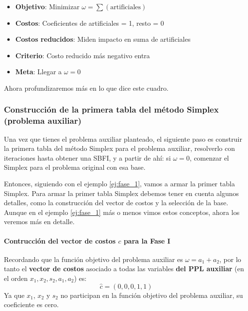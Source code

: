 \begin{tcolorbox}[interesting_data, title=Siempre recordar lo que se busca en la Fase I]
  \begin{itemize}
    \item \textbf{Objetivo}: Minimizar \(\omega = \sum(\text{artificiales})\)
    \item \textbf{Costos}: Coeficientes de artificiales = 1, resto = 0
    \item \textbf{Costos reducidos}: Miden impacto en suma de artificiales
    \item \textbf{Criterio}: Costo reducido más negativo entra
    \item \textbf{Meta}: Llegar a \(\omega = 0\)
  \end{itemize}
\end{tcolorbox}
Ahora profundizaremos más en lo que dice este cuadro. 

\subsubsection{Construcción de la primera tabla del método Simplex (problema auxiliar)}

Una vez que tienes el problema auxiliar planteado, el siguiente paso es construir la primera tabla del método Simplex para el problema auxiliar, resolverlo con iteraciones hasta obtener una SBFI, y a partir de ahí: si \(\omega = 0\), comenzar el Simplex para el problema original con esa base.

Entonces, siguiendo con el ejemplo \ref{ej:fase_1}, vamos a armar la primer tabla Simplex. Para armar la primer tabla Simplex debemos tener en cuenta algunos detalles, como la construcción del vector de costos y la selección de la base. Aunque en el ejemplo \ref{ej:fase_1} más o menos vimos estos conceptos, ahora los veremos más en detalle.

\paragraph{Contrucción del vector de costos \(c\) para la Fase I}

Recordando que la función objetivo del problema auxiliar es \(\omega = a_1 + a_2\), por lo tanto el \textbf{vector de costos} asociado a todas las variables \textbf{del PPL auxiliar} (en el orden \(x_1, x_2, s_2, a_1, a_2\)) es: 
\[
  \hat{c} = (0, 0, 0, 1, 1)
\]
Ya que \(x_1\), \(x_2\) y \(s_2\) no participan en la función objetivo del problema auxiliar, su coeficiente es cero.

